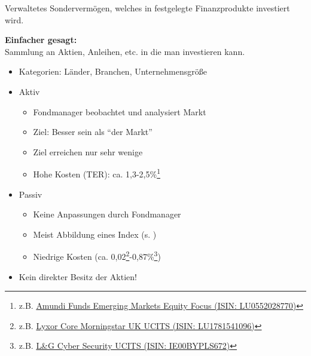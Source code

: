 \documentclass{beamer}
\begin{document}
			\begin{frame}
				\begin{definition}
					Verwaltetes Sondervermögen, welches in festgelegte Finanzprodukte investiert wird.
				\end{definition}\hfill
			
				\textbf{Einfacher gesagt:}\\
				Sammlung an Aktien, Anleihen, etc. in die man investieren kann.
			\end{frame}
		
			\begin{frame}
				\begin{itemize}
					\item Kategorien: Länder, Branchen, Unternehmensgröße\pause
					\item Aktiv
					\begin{itemize}
						\item Fondmanager beobachtet und analysiert Markt
						\item Ziel: Besser sein als "`der Markt"'
						\item Ziel erreichen nur sehr wenige
						\item Hohe Kosten (TER): ca. 1,3-2,5\%\footnote{z.B. \href{https://www.comdirect.de/inf/fonds/LU0552028770}{Amundi Funds Emerging Markets Equity Focus (ISIN: LU0552028770)}}
					\end{itemize}\pause
					\item Passiv\pause
					\begin{itemize}
						\item Keine Anpassungen durch Fondmanager
						\item Meist Abbildung eines Index (s. \nameref{subsec:etfs})
						\item Niedrige Kosten (ca. 0,02\footnote{z.B. \href{https://de.extraetf.com/etf-profile/LU1781541096}{Lyxor Core Morningstar UK UCITS (ISIN: LU1781541096)}}-0,87\%\footnote{z.B. \href{https://de.extraetf.com/etf-profile/IE00BYPLS672}{L\&G Cyber Security UCITS (ISIN: IE00BYPLS672)}})
					\end{itemize}\pause
					\item Kein direkter Besitz der Aktien!
				\end{itemize}
			\end{frame}
		
\end{document}
